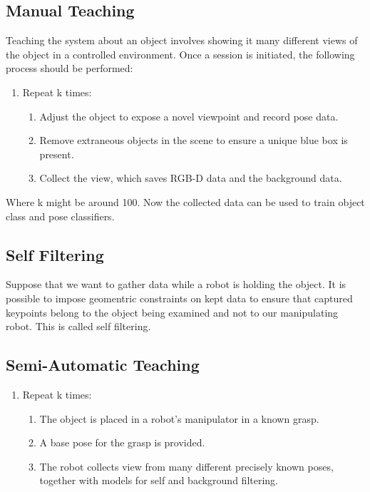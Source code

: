 \documentclass[12pt]{article}
\numberwithin{equation}{section}
\numberwithin{table}{section}
\numberwithin{figure}{section}
\begin{document}
\subsection{Manual Teaching}
Teaching the system about an object involves showing it many different views of
the object in a controlled environment. Once a session is initiated, the following
process should be performed:

\begin{enumerate}
  \item Repeat k times:
  \begin{enumerate}
    \item Adjust the object to expose a novel viewpoint and record pose data.
    \item Remove extraneous objects in the scene to ensure a unique blue box is present.
    \item Collect the view, which saves RGB-D data and the background data.
  \end{enumerate}
\end{enumerate}

Where k might be around 100. Now the collected data can be used to train object class
and pose classifiers.

\subsection{Self Filtering}
Suppose that we want to gather data while a robot is holding the object. It is possible
to impose geomentric constraints on kept data to ensure that captured keypoints
belong to the object being examined and not to our manipulating robot. This is
called self filtering.

\subsection{Semi-Automatic Teaching}

\begin{enumerate}
  \item Repeat k times:
  \begin{enumerate}
    \item The object is placed in a robot's manipulator in a known grasp.
    \item A base pose for the grasp is provided.
    \item The robot collects view from many different precisely known poses, together with models for self and background filtering.
  \end{enumerate}
\end{enumerate}
\end{document}
